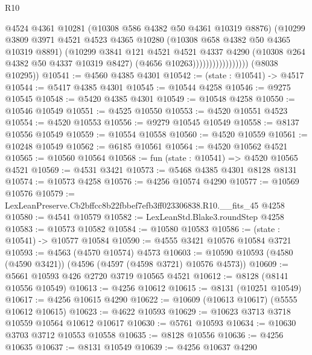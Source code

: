 \begin{lexlean}{R10}
\begin{coremodule}
                                  @4524
                                  @4361
                                  @10281
                                  (@10308 @586 @4382 @50 @4361 @10319 @8876)
                                  (@10299
                                    @3809
                                    @3971
                                    @4521
                                    @4523
                                    @4365
                                    @10280
                                    (@10308 @658 @4382 @50 @4365 @10319 @8891)
                                    (@10299
                                      @3841
                                      @121
                                      @4521
                                      @4521
                                      @4337
                                      @4290
                                      (@10308 @264 @4382 @50 @4337 @10319 @8427)
                                      (@4656 @10263)))))))))))))))))
      (@8038 @10295))
@10541 := @4560 @4385 @4301
@10542 := (state : @10541) -> @4517
@10544 := @5417 @4385 @4301
@10545 := @10544 @4258
@10546 := @9275 @10545
@10548 := @5420 @4385 @4301
@10549 := @10548 @4258
@10550 := @10546 @10549
@10551 := @4525 @10550
@10553 := @4520 @10551 @4523
@10554 := @4520 @10553
@10556 := @9279 @10545 @10549
@10558 := @8137 @10556 @10549
@10559 := @10554 @10558
@10560 := @4520 @10559
@10561 := @10248 @10549
@10562 := @6185 @10561
@10564 := @4520 @10562 @4521
@10565 := @10560 @10564
@10568 := fun (state : @10541) => @4520 @10565 @4521
@10569 := @4531 @3421
@10573 := @5468 @4385 @4301 @8128 @8131
@10574 := @10573 @4258
@10576 := @4256 @10574 @4290
@10577 := @10569 @10576
@10579 := LexLeanPreserve.Cb2bffcc8b22fbbef7efb3ff023306838.R10.__fits_45 @4258
@10580 := @4541 @10579
@10582 := LexLeanStd.Blake3.roundStep @4258
@10583 := @10573 @10582
@10584 := @10580 @10583
@10586 := (state : @10541) -> @10577 @10584
@10590 := @4555 @3421 @10576 @10584 @3721
@10593 := @4563 (@4570 @10574) @4573
@10603 := @10590 @10593 (@4580 (@4590 @3421)) (@4596 (@4597 (@4598 @3721) @10576 @4573))
@10609 := @5661 @10593 @426 @2720 @3719 @10565 @4521
@10612 := @8128 (@8141 @10556 @10549)
@10613 := @4256 @10612
@10615 := @8131 (@10251 @10549)
@10617 := @4256 @10615 @4290
@10622 := @10609 (@10613 @10617) (@5555 @10612 @10615)
@10623 := @4622 @10593
@10629 := @10623 @3713 @3718 @10559 @10564 @10612 @10617
@10630 := @5761 @10593
@10634 := @10630 @3703 @3712 @10553 @10558
@10635 := @8128 @10556
@10636 := @4256 @10635
@10637 := @8131 @10549
@10639 := @4256 @10637 @4290

\end{coremodule}
\end{lexlean}
